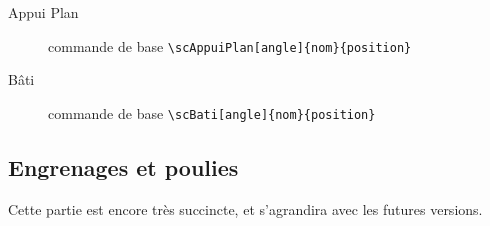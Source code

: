 \documentclass[a4paper,11pt]{article}                      %
\begin{document}
\begin{description}
\newpage


\item[Appui Plan] commande de base \verb"\scAppuiPlan[angle]{nom}{position}" 


\begin{tkzexample}
\end{tkzexample}


\item[Bâti] commande de base \verb"\scBati[angle]{nom}{position}" 

\begin{tkzexample}
\end{tkzexample}


\end{description}


\subsection{Engrenages et poulies}

Cette partie est encore très succincte, et s'agrandira avec les futures versions.
\end{document}
